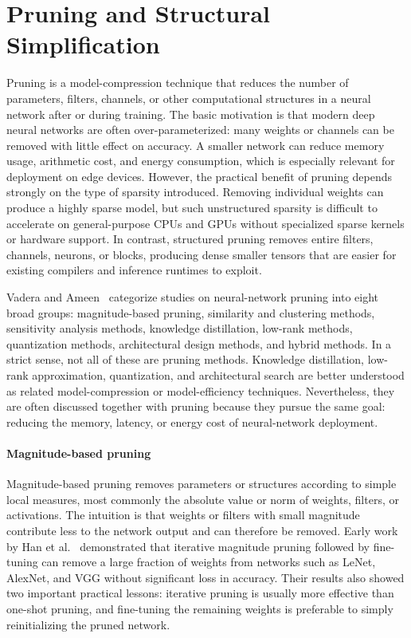 \documentclass[12pt,a4paper]{report}
\begin{document}
\section{Pruning and Structural Simplification}

Pruning is a model-compression technique that reduces the number of parameters, filters,
channels, or other computational structures in a neural network after or during training. The
basic motivation is that modern deep neural networks are often over-parameterized: many weights
or channels can be removed with little effect on accuracy. A smaller network can reduce memory
usage, arithmetic cost, and energy consumption, which is especially relevant for deployment on
edge devices. However, the practical benefit of pruning depends strongly on the type of sparsity
introduced. Removing individual weights can produce a highly sparse model, but such
unstructured sparsity is difficult to accelerate on general-purpose CPUs and GPUs without
specialized sparse kernels or hardware support. In contrast, structured pruning removes entire
filters, channels, neurons, or blocks, producing dense smaller tensors that are easier for existing
compilers and inference runtimes to exploit.

Vadera and Ameen~\cite{vadera2022methods} categorize studies on neural-network pruning into
eight broad groups: magnitude-based pruning, similarity and clustering methods, sensitivity
analysis methods, knowledge distillation, low-rank methods, quantization methods, architectural
design methods, and hybrid methods. In a strict sense, not all of these are pruning methods.
Knowledge distillation, low-rank approximation, quantization, and architectural search are better
understood as related model-compression or model-efficiency techniques. Nevertheless, they are
often discussed together with pruning because they pursue the same goal: reducing the memory,
latency, or energy cost of neural-network deployment.

\paragraph{Magnitude-based pruning}
Magnitude-based pruning removes parameters or structures according to simple local measures,
most commonly the absolute value or norm of weights, filters, or activations. The intuition is that
weights or filters with small magnitude contribute less to the network output and can therefore be
removed. Early work by Han et al.~\cite{han2015learning} demonstrated that iterative magnitude
pruning followed by fine-tuning can remove a large fraction of weights from networks such as
LeNet, AlexNet, and VGG without significant loss in accuracy. Their results also showed two
important practical lessons: iterative pruning is usually more effective than one-shot pruning, and
fine-tuning the remaining weights is preferable to simply reinitializing the pruned network.
\end{document}
